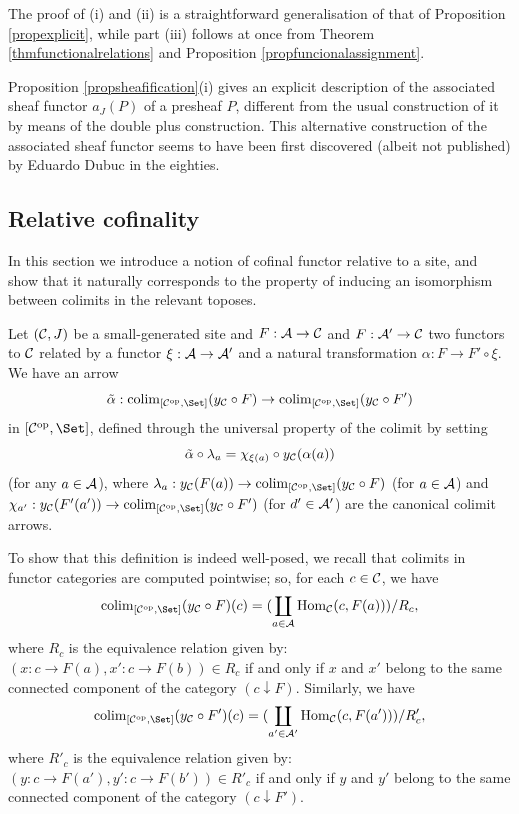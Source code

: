 \documentclass[a4paper,12pt]{article}
\begin{document}
\begin{proofs}
	The proof of (i) and (ii) is a straightforward generalisation of that of Proposition \ref{propexplicit}, while part (iii) follows at once from Theorem \ref{thmfunctionalrelations} and Proposition \ref{propfuncionalassignment}.  	
\end{proofs}

\begin{remark}
	Proposition \ref{propsheafification}(i) gives an explicit description of the associated sheaf functor $a_{J}(P)$ of a presheaf $P$, different from the usual construction of it by means of the double plus construction. This alternative construction of the associated sheaf functor seems to have been first discovered (albeit not published) by Eduardo Dubuc in the eighties. 
\end{remark} 

\subsection{Relative cofinality}\label{sec:relativecofinality}

In this section we introduce a notion of cofinal functor relative to a site, and show that it naturally corresponds to the property of inducing an isomorphism between colimits in the relevant toposes. 

Let $({\cal C}, J)$ be a small-generated site and $F:{\cal A}\to {\cal C}$ and $F:{\cal A}'\to {\cal C}$ two functors to $\cal C$ related by a functor $\xi:{\cal A}\to {\cal A}'$ and a natural transformation $\alpha:F\to F'\circ \xi$. We have an arrow 
\[
\tilde{\alpha}: \textup{colim}_{[{\cal C}^{\textup{op}}, \Set]}(y_{\cal C}\circ F) \to \textup{colim}_{[{\cal C}^{\textup{op}}, \Set]}(y_{\cal C}\circ F')
\]
in $[{\cal C}^{\textup{op}}, \Set]$, defined through the universal property of the colimit by setting
\[
\tilde{\alpha} \circ \lambda_{a}= \chi_{\xi(a)}\circ y_{\cal C}(\alpha(a))
\]
(for any $a\in {\cal A}$), where $\lambda_{a}:y_{\cal C}(F(a))\to \textup{colim}_{[{\cal C}^{\textup{op}}, \Set]}(y_{\cal C}\circ F)$ (for $a\in {\cal A}$) and $\chi_{a'}:y_{\cal C}(F'(a'))\to \textup{colim}_{[{\cal C}^{\textup{op}}, \Set]}(y_{\cal C}\circ F')$ (for $d'\in {\cal A}'$) are the canonical colimit arrows. 

To show that this definition is indeed well-posed, we recall that colimits in functor categories are computed pointwise; so, for each $c\in {\cal C}$, we have 
\[
\textup{colim}_{[{\cal C}^{\textup{op}}, \Set]}(y_{\cal C}\circ F)(c)=(\coprod_{a\in {\cal A}}\textup{Hom}_{\cal C}(c, F(a)))\slash R_{c},
\] 
where $R_{c}$ is the equivalence relation given by: $(x:c\to F(a), x':c\to F(b))\in R_{c}$ if and only if $x$ and $x'$ belong to the same connected component of the category $(c\downarrow F)$. Similarly, we have 
\[
\textup{colim}_{[{\cal C}^{\textup{op}}, \Set]}(y_{\cal C}\circ F')(c)=(\coprod_{a'\in {\cal A}'}\textup{Hom}_{\cal C}(c, F(a')))\slash R'_{c},
\]
where $R'_{c}$ is the equivalence relation given by: $(y:c\to F(a'), y':c\to F(b'))\in R'_{c}$ if and only if $y$ and $y'$ belong to the same connected component of the category $(c\downarrow F')$.
\end{document}
